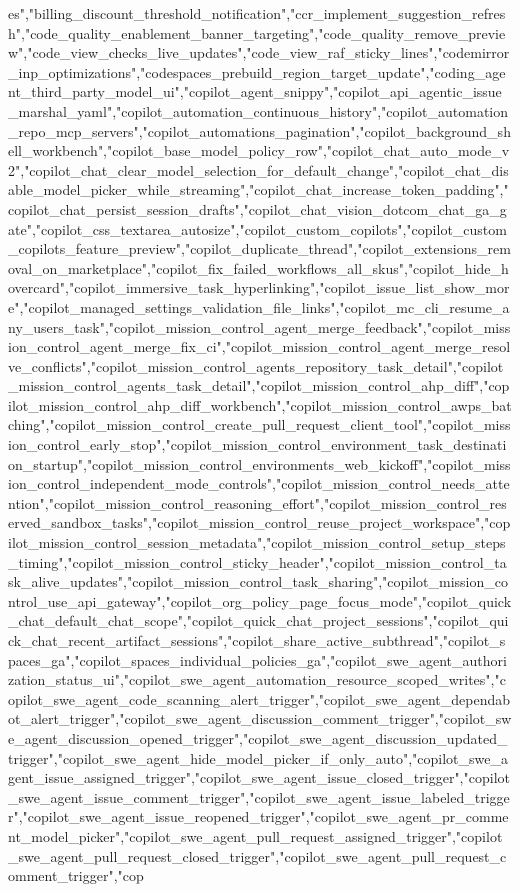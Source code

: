 {{{{{{{{{{es","billing_discount_threshold_notification","ccr_implement_suggestion_refresh","code_quality_enablement_banner_targeting","code_quality_remove_preview","code_view_checks_live_updates","code_view_raf_sticky_lines","codemirror_inp_optimizations","codespaces_prebuild_region_target_update","coding_agent_third_party_model_ui","copilot_agent_snippy","copilot_api_agentic_issue_marshal_yaml","copilot_automation_continuous_history","copilot_automation_repo_mcp_servers","copilot_automations_pagination","copilot_background_shell_workbench","copilot_base_model_policy_row","copilot_chat_auto_mode_v2","copilot_chat_clear_model_selection_for_default_change","copilot_chat_disable_model_picker_while_streaming","copilot_chat_increase_token_padding","copilot_chat_persist_session_drafts","copilot_chat_vision_dotcom_chat_ga_gate","copilot_css_textarea_autosize","copilot_custom_copilots","copilot_custom_copilots_feature_preview","copilot_duplicate_thread","copilot_extensions_removal_on_marketplace","copilot_fix_failed_workflows_all_skus","copilot_hide_hovercard","copilot_immersive_task_hyperlinking","copilot_issue_list_show_more","copilot_managed_settings_validation_file_links","copilot_mc_cli_resume_any_users_task","copilot_mission_control_agent_merge_feedback","copilot_mission_control_agent_merge_fix_ci","copilot_mission_control_agent_merge_resolve_conflicts","copilot_mission_control_agents_repository_task_detail","copilot_mission_control_agents_task_detail","copilot_mission_control_ahp_diff","copilot_mission_control_ahp_diff_workbench","copilot_mission_control_awps_batching","copilot_mission_control_create_pull_request_client_tool","copilot_mission_control_early_stop","copilot_mission_control_environment_task_destination_startup","copilot_mission_control_environments_web_kickoff","copilot_mission_control_independent_mode_controls","copilot_mission_control_needs_attention","copilot_mission_control_reasoning_effort","copilot_mission_control_reserved_sandbox_tasks","copilot_mission_control_reuse_project_workspace","copilot_mission_control_session_metadata","copilot_mission_control_setup_steps_timing","copilot_mission_control_sticky_header","copilot_mission_control_task_alive_updates","copilot_mission_control_task_sharing","copilot_mission_control_use_api_gateway","copilot_org_policy_page_focus_mode","copilot_quick_chat_default_chat_scope","copilot_quick_chat_project_sessions","copilot_quick_chat_recent_artifact_sessions","copilot_share_active_subthread","copilot_spaces_ga","copilot_spaces_individual_policies_ga","copilot_swe_agent_authorization_status_ui","copilot_swe_agent_automation_resource_scoped_writes","copilot_swe_agent_code_scanning_alert_trigger","copilot_swe_agent_dependabot_alert_trigger","copilot_swe_agent_discussion_comment_trigger","copilot_swe_agent_discussion_opened_trigger","copilot_swe_agent_discussion_updated_trigger","copilot_swe_agent_hide_model_picker_if_only_auto","copilot_swe_agent_issue_assigned_trigger","copilot_swe_agent_issue_closed_trigger","copilot_swe_agent_issue_comment_trigger","copilot_swe_agent_issue_labeled_trigger","copilot_swe_agent_issue_reopened_trigger","copilot_swe_agent_pr_comment_model_picker","copilot_swe_agent_pull_request_assigned_trigger","copilot_swe_agent_pull_request_closed_trigger","copilot_swe_agent_pull_request_comment_trigger","cop}}}}}}}}}}
